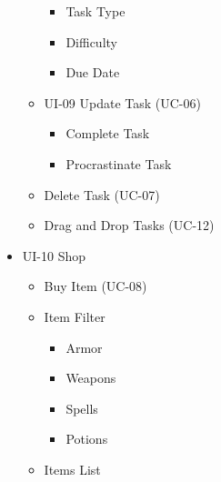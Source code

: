 \documentclass[12pt]{report}
\renewcommand{\_}{\kern-1.5pt\textunderscore\kern-1.5pt}
\begin{document}
\begin{itemize}
\begin{itemize}
\begin{itemize}
	\item Task Type\par

	\item Difficulty\par

	\item Due Date \par


\end{itemize}
	\item UI-09 Update Task (UC-06)\tab \par

\begin{itemize}
	\item Complete Task\par

	\item Procrastinate Task\par


\end{itemize}
	\item Delete Task (UC-07)\par

	\item Drag and Drop Tasks (UC-12)\par


\end{itemize}
	\item UI-10 Shop\par

\begin{itemize}
	\item Buy Item (UC-08)\par

	\item Item Filter\par

\begin{itemize}
	\item Armor\par

	\item Weapons\par

	\item Spells\par

	\item Potions\par


\end{itemize}
	\item Items List\par


\end{itemize}
\end{itemize}
\end{document}
